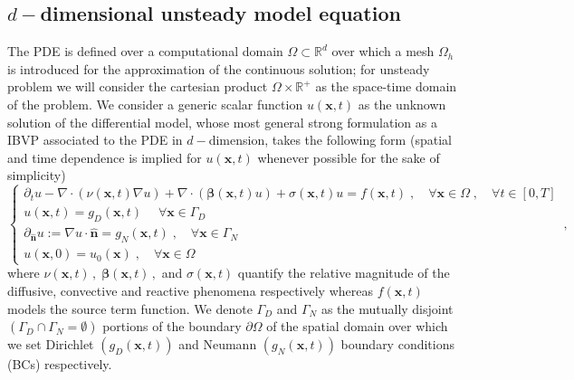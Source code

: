 \documentclass[12pt,openany,twoside,a4paper]{article}
\begin{document}
\subsection{$d-$dimensional unsteady model equation}
The PDE is defined over a computational domain $\Omega\subset\mathbb{R}^d$ over which a mesh $\Omega_h$ is introduced for the approximation of the continuous solution; for unsteady problem we will consider the cartesian product $\Omega\times\mathbb{R}^{+}$ as the space-time domain of the problem.
We consider a generic scalar function $u(\mathbf{x},t)$ as the unknown solution of the differential model, whose most general strong formulation as a IBVP associated to the PDE in $d-$dimension, takes the following form (spatial and time dependence is implied for $u(\mathbf{x},t)$ whenever possible for the sake of simplicity)
\begin{equation*}
    \begin{cases}
        \partial_t u- \nabla\cdot(\nu(\mathbf{x},t)\nabla u) + \nabla\cdot(\boldsymbol{\beta}(\mathbf{x},t)u) + \sigma(\mathbf{x},t)u = f(\mathbf{x},t)\;,\quad \forall\mathbf{x}\in\Omega\;,\quad\forall t\in[0,T] \\
        u(\mathbf{x},t) = g_D(\mathbf{x},t)\;\quad\forall\mathbf{x}\in\Gamma_D \\
        \partial_{\mathbf{\hat{n}}}u := \nabla u\cdot\mathbf{\hat{n}} = g_N(\mathbf{x},t)\;,\quad\forall\mathbf{x}\in\Gamma_N\\
        u(\mathbf{x},0) = u_0(\mathbf{x})\;,\quad\forall\mathbf{x}\in\Omega
    \end{cases}\,,
\end{equation*}
where $\nu(\mathbf{x},t)\,,\;\boldsymbol{\beta}(\mathbf{x},t)\,,$ and $\sigma(\mathbf{x},t)$ quantify the relative magnitude of the diffusive, convective and reactive phenomena respectively whereas $f(\mathbf{x},t)$ models the source term function. We denote $\Gamma_D$ and $\Gamma_N$ as the mutually disjoint $(\Gamma_D\cap\Gamma_N = \emptyset)$ portions of the boundary $\partial\Omega$ of the spatial domain over which we set Dirichlet $(g_D(\mathbf{x},t))$ and Neumann $(g_N(\mathbf{x},t))$ boundary conditions (BCs) respectively.
\end{document}
